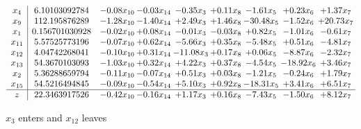 \documentclass[9pt]{article}
\begin{document}
 \[\begin{array}{c| c c@{\hskip 2pt} c@{\hskip 2pt} c@{\hskip 2pt} c@{\hskip 2pt} c@{\hskip 2pt} c@{\hskip 2pt} c@{\hskip 2pt} }
 x_{4}   &  6.10103092784 & -0.08 x_{10} & -0.03 x_{14} & -0.35 x_{3} & +  0.11 x_{8} & -1.61 x_{5} & +  0.23 x_{6} & +  1.37 x_{7}\\
 x_{9}   &  112.195876289 & -1.28 x_{10} & -1.40 x_{14} & +  2.49 x_{3} & +  1.46 x_{8} & -30.48 x_{5} & -1.52 x_{6} & + 20.73 x_{7}\\
 x_{1}   &  0.156701030928 & -0.02 x_{10} & +  0.08 x_{14} & -0.01 x_{3} & -0.03 x_{8} & +  0.82 x_{5} & -1.01 x_{6} & -0.61 x_{7}\\
 x_{11}   &  5.57525773196 & -0.07 x_{10} & +  0.62 x_{14} & -5.66 x_{3} & +  0.35 x_{8} & -5.48 x_{5} & +  0.51 x_{6} & -4.81 x_{7}\\
 x_{12}   &  4.04742268041 & -0.10 x_{10} & +  0.31 x_{14} & -11.08 x_{3} & +  0.17 x_{8} & +  0.06 x_{5} & -8.87 x_{6} & -2.32 x_{7}\\
 x_{13}   &  54.3670103093 & -1.03 x_{10} & +  0.32 x_{14} & +  4.22 x_{3} & +  0.37 x_{8} & -4.54 x_{5} & -18.92 x_{6} & +  3.46 x_{7}\\
 x_{2}   &  5.36288659794 & -0.11 x_{10} & -0.07 x_{14} & +  0.51 x_{3} & +  0.03 x_{8} & -1.21 x_{5} & -0.24 x_{6} & +  1.79 x_{7}\\
 x_{15}   &  54.5216494845 & -0.09 x_{10} & -0.54 x_{14} & +  5.10 x_{3} & +  0.92 x_{8} & -18.31 x_{5} & +  3.41 x_{6} & +  6.51 x_{7}\\
\hline
z    &  22.3463917526 & -0.42 x_{10} & -0.16 x_{14} & +  1.17 x_{3} & +  0.16 x_{8} & -7.43 x_{5} & -1.50 x_{6} & +  8.12 x_{7}\\
\end{array}\]


 $ x_{3} $ enters and $ x_{12} $ leaves 
\end{document}
